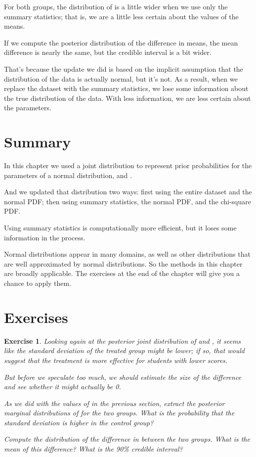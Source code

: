 \documentclass[12pt]{book}
\theoremstyle{exercise}
\newtheorem{exercise}{Exercise}[chapter]
\begin{document}
For both groups, the distribution of  is a little wider when we use only the summary statistics; that is, we are a little less certain about the values of the means.

If we compute the posterior distribution of the difference in means,
the mean difference is nearly the same, but the credible interval is a bit wider.

That's because the update we did is based on the implicit assumption
that the distribution of the data is actually normal, but it's not.  
As a result, when we replace the dataset with the summary statistics, we lose some information about the true distribution of the data. With less
information, we are less certain about the parameters.

\section{Summary}

In this chapter we used a joint distribution to represent prior
probabilities for the parameters of a normal distribution,
 and .

And we updated that distribution two ways: first using the entire
dataset and the normal PDF; then using summary statistics, the normal
PDF, and the chi-square PDF.

Using summary statistics is computationally more efficient, but it loses
some information in the process.

Normal distributions appear in many domains, as well as other
distributions that are well approximated by normal distributions. So the
methods in this chapter are broadly applicable. The exercises at the end
of the chapter will give you a chance to apply them.

\section{Exercises}

\begin{exercise} 
Looking again at the posterior joint distribution of
 and , it
seems like the standard deviation of the treated group might be lower;
if so, that would suggest that the treatment is more effective for
students with lower scores.

But before we speculate too much, we should estimate the size of the
difference and see whether it might actually be 0.

As we did with the values of  in the
previous section, extract the posterior marginal distributions of
 for the two groups. What is the
probability that the standard deviation is higher in the control group?

Compute the distribution of the difference in
 between the two groups. What is the mean
of this difference? What is the 90\% credible interval?

\end{exercise}
\end{document}
